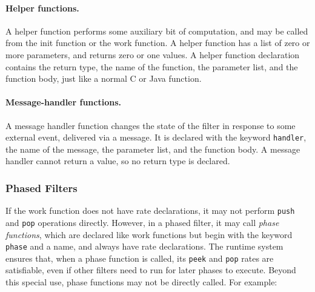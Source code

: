 \documentclass[11pt]{article}
\newcommand{\new}{\marginpar{\footnotesize \textbf{~~--~New~--}}}
\begin{document}
\paragraph{Helper functions.}  A helper function performs some
auxiliary bit of computation, and may be called from the init function
or the work function.  A helper function has a list of zero or more
parameters, and returns zero or one values.  A helper function
declaration contains the return type, the name of the function, the
parameter list, and the function body, just like a normal C or Java
function.

\paragraph{Message-handler functions.}  A message handler function
changes the state of the filter in response to some external event,
delivered via a message.  It is declared with the keyword
\lstinline|handler|, the name of the message, the parameter list, and
the function body.  A message handler cannot return a value, so no
return type is declared.


\subsubsection{Phased Filters}  
\label{sec:phased-filter}

If the work function does not have rate declarations, it may not
perform \lstinline|push| and \lstinline|pop| operations directly.
However, in a phased filter, it may call \emph{phase functions}, which
are declared like work functions but begin with the keyword
\lstinline|phase| and a name, and always have rate declarations.  The
runtime system ensures that, when a phase function is called, its
\lstinline|peek| and \lstinline|pop| rates are satisfiable, even if
other filters need to run for later phases to execute.  Beyond this
special use, phase functions may not be directly called.  For example:
\end{document}
